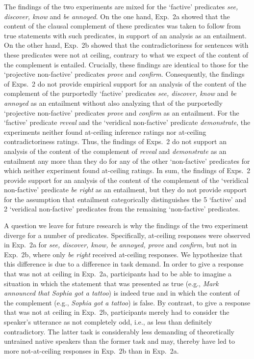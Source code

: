 \documentclass[11pt,fleqn]{article}
\newcommand{\6}{\mbox{$[\hspace*{-.6mm}[$}}
\newcommand{\9}{\mbox{$]\hspace*{-.6mm}]$}}
\begin{document}
{The findings of the two experiments are mixed for the `factive' predicates {\em see, discover, know} and {\em be annoyed}. On the one hand, Exp.~2a showed that the content of the clausal complement of these predicates was  taken to follow from true statements with such predicates, in support of an analysis as an entailment. On the other hand, Exp.~2b showed that the contradictoriness for sentences with these predicates were not at ceiling, contrary to what we expect of the content of the complement is entailed. Crucially, these findings are identical to those for the `projective non-factive' predicates {\em prove} and {\em confirm}. Consequently, the findings of Exps.~2 do not provide empirical support for an analysis of the content of the complement of the purportedly `factive' predicates {\em see, discover, know} and {\em be annoyed} as an entailment without also analyzing that of the purportedly `projective non-factive' predicates {\em prove} and {\em confirm} as an entailment. For the `factive' predicate {\em reveal} and the `veridical non-factive' predicate {\em demonstrate}, the experiments neither found at-ceiling inference ratings nor at-ceiling contradictoriness ratings. Thus, the findings of Exps.~2 do not support an analysis of the content of the complement of {\em reveal} and {\em demonstrate} as an entailment any more than they do for any of the other `non-factive' predicates for which neither experiment found at-ceiling ratings. In sum, the findings of Exps.~2 provide support for an analysis of the content of the complement of the `veridical non-factive' predicate {\em be right} as an entailment, but they do not provide support for the assumption that entailment categorically distinguishes the 5 `factive' and 2 `veridical non-factive' predicates from the remaining `non-factive' predicates.

A question we leave for future research is why the findings of the two experiment diverge for a number of predicates. Specifically, at-ceiling responses were observed in Exp.~2a for {\em see, discover, know, be annoyed, prove} and {\em confirm}, but not in Exp.~2b, where only {\em be right} received at-ceiling responses. We hypothesize that this difference is due to a difference in task demand. In order to give a response that was not at ceiling in Exp.~2a, participants had to be able to imagine a situation in which the statement that was presented as true (e.g., {\em Mark announced that Sophia got a tattoo}) is indeed true and in which the content of the complement (e.g., {\em Sophia got a tattoo}) is false. By contrast, to give a response that was not at ceiling in Exp.~2b, participants merely had to consider the speaker's utterance as not completely odd, i.e., as less than definitely contradictory. The latter task is considerably less demanding of theoretically untrained native speakers than the former task and may, thereby have led to more not-at-ceiling responses in Exp.~2b than in Exp.~2a.

}
\end{document}
